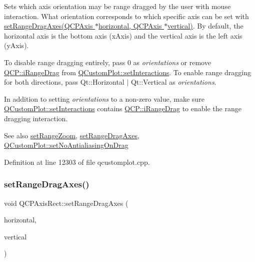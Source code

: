 Sets which axis orientation may be range dragged by the user with mouse interaction. What orientation corresponds to which specific axis can be set with \hyperlink{class_q_c_p_axis_rect_a648cce336bd99daac4a5ca3e5743775d}{set\+Range\+Drag\+Axes(\+Q\+C\+P\+Axis $\ast$horizontal, Q\+C\+P\+Axis $\ast$vertical)}. By default, the horizontal axis is the bottom axis (x\+Axis) and the vertical axis is the left axis (y\+Axis).

To disable range dragging entirely, pass 0 as {\itshape orientations} or remove \hyperlink{namespace_q_c_p_a2ad6bb6281c7c2d593d4277b44c2b037a2c4432b9aceafb94000be8d1b589ef18}{Q\+C\+P\+::i\+Range\+Drag} from \hyperlink{class_q_custom_plot_a5ee1e2f6ae27419deca53e75907c27e5}{Q\+Custom\+Plot\+::set\+Interactions}. To enable range dragging for both directions, pass {\ttfamily Qt\+::\+Horizontal $\vert$ Qt\+::\+Vertical} as {\itshape orientations}.

In addition to setting {\itshape orientations} to a non-\/zero value, make sure \hyperlink{class_q_custom_plot_a5ee1e2f6ae27419deca53e75907c27e5}{Q\+Custom\+Plot\+::set\+Interactions} contains \hyperlink{namespace_q_c_p_a2ad6bb6281c7c2d593d4277b44c2b037a2c4432b9aceafb94000be8d1b589ef18}{Q\+C\+P\+::i\+Range\+Drag} to enable the range dragging interaction.

\begin{DoxySeeAlso}{See also}
\hyperlink{class_q_c_p_axis_rect_a7960a9d222f1c31d558b064b60f86a31}{set\+Range\+Zoom}, \hyperlink{class_q_c_p_axis_rect_a648cce336bd99daac4a5ca3e5743775d}{set\+Range\+Drag\+Axes}, \hyperlink{class_q_custom_plot_a775bdcb6329d44701aeaa6135b0e5265}{Q\+Custom\+Plot\+::set\+No\+Antialiasing\+On\+Drag} 
\end{DoxySeeAlso}


Definition at line 12303 of file qcustomplot.\+cpp.

\mbox{\label{class_q_c_p_axis_rect_a648cce336bd99daac4a5ca3e5743775d}} 
\subsubsection{\texorpdfstring{set\+Range\+Drag\+Axes()}{setRangeDragAxes()}}
{\footnotesize\ttfamily void Q\+C\+P\+Axis\+Rect\+::set\+Range\+Drag\+Axes (\begin{DoxyParamCaption}\item[{\hyperlink{class_q_c_p_axis}{Q\+C\+P\+Axis} $\ast$}]{horizontal,  }\item[{\hyperlink{class_q_c_p_axis}{Q\+C\+P\+Axis} $\ast$}]{vertical }\end{DoxyParamCaption})}


